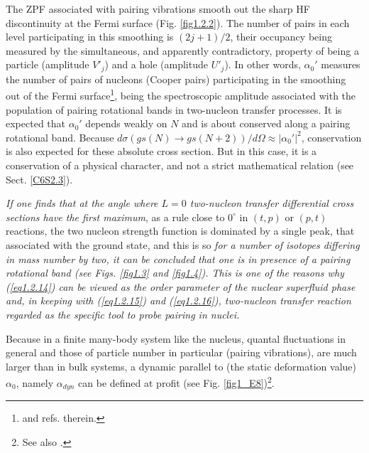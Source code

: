 The ZPF associated with pairing vibrations  smooth out the sharp HF discontinuity at the Fermi surface (Fig. \ref{fig1.2.2}). The number of pairs 
 in each level participating in this smoothing is $(2j+1)/2$, their occupancy being measured by the simultaneous, and apparently contradictory, property of being a particle (amplitude $V'_j$) and a hole (amplitude $U'_j$). In other words, $\alpha_0'$ measures the number of pairs of nucleons (Cooper pairs) participating in the smoothing out of the Fermi surface\footnote{\cite{Schrieffer:64,Potel:17} and refs. therein.}, being  the spectroscopic amplitude associated with the population of pairing rotational bands in two-nucleon transfer processes. It is expected that $\alpha_0'$ depends weakly on $N$ and is about conserved along a pairing rotational band. Because $d\sigma(gs(N)\rightarrow gs(N+2))/d\Omega\approx|\alpha_0'|^2$, conservation is also expected for these absolute cross section. But in this case, it is a conservation of a physical character, and not a strict mathematical relation (see Sect. \ref{C6S2.3}). 


\textit{If one finds that at the angle where $L=0$ two-nucleon transfer differential cross sections have the first maximum}, as a rule close to $0^\circ$ in $(t,p)$ or $(p,t)$ reactions, the two nucleon strength function is dominated by a single peak, that associated with the ground state, and this is so \textit{for a number of isotopes differing in mass number by two, it can be concluded that one is in presence of a pairing rotational band (see Figs. \ref{fig1.3} and \ref{fig1.4}). This is one of the reasons why (\ref{eq1.2.14}) can be viewed as the order parameter of the nuclear superfluid phase and, in keeping with (\ref{eq1.2.15}) and (\ref{eq1.2.16}), two-nucleon transfer reaction regarded as the specific tool to probe pairing in nuclei.}

Because in a finite many-body system like the nucleus, quantal fluctuations in general and those of particle number in particular (pairing vibrations), are much larger than in bulk systems, a dynamic parallel to (the static deformation value) $\alpha_0$, namely $\alpha_{dyn}$ can be defined at profit (see Fig. \ref{fig1_E8})\footnote{See also \cite{Potel:17}.}. 
